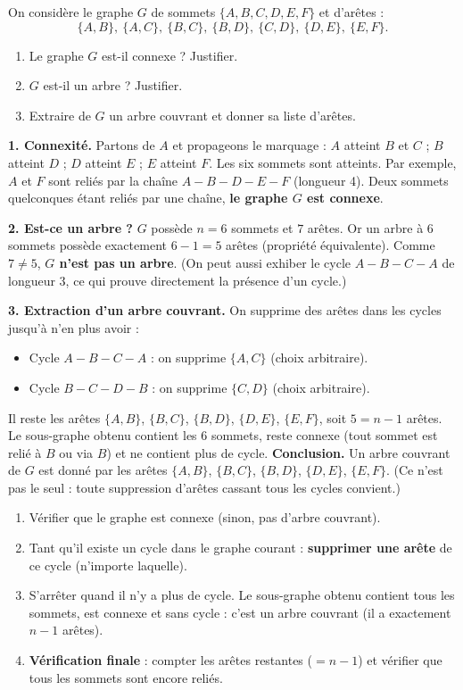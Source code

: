 \documentclass[11pt]{article}
\newcounter{popsec}
\newcounter{popsub}
\newcommand{\courssub}[1]{%
  \stepcounter{popsub}%
  \par\vspace{9pt}\noindent{\popxbold\fontsize{11.5}{13}\selectfont\color{popink}{\color{poporange}\thepopsec.\thepopsub}\hspace{6pt}#1}\par\nopagebreak\vspace{4pt}
}
\begin{document}
\begin{exoresolu}
On considère le graphe $G$ de sommets $\{A,B,C,D,E,F\}$ et d'arêtes :
\[\{A,B\},\ \{A,C\},\ \{B,C\},\ \{B,D\},\ \{C,D\},\ \{D,E\},\ \{E,F\}.\]
\begin{enumerate}
\item Le graphe $G$ est-il connexe ? Justifier.
\item $G$ est-il un arbre ? Justifier.
\item Extraire de $G$ un arbre couvrant et donner sa liste d'arêtes.
\end{enumerate}
\tcblower
\textbf{1. Connexité.} Partons de $A$ et propageons le marquage :
$A$ atteint $B$ et $C$ ; $B$ atteint $D$ ; $D$ atteint $E$ ; $E$ atteint $F$.
Les six sommets sont atteints. Par exemple, $A$ et $F$ sont reliés par la chaîne $A-B-D-E-F$ (longueur 4).
Deux sommets quelconques étant reliés par une chaîne, \textbf{le graphe $G$ est connexe}.

\textbf{2. Est-ce un arbre ?} $G$ possède $n = 6$ sommets et $7$ arêtes.
Or un arbre à $6$ sommets possède exactement $6-1 = 5$ arêtes (propriété équivalente).
Comme $7 \neq 5$, \textbf{$G$ n'est pas un arbre}.
(On peut aussi exhiber le cycle $A-B-C-A$ de longueur 3, ce qui prouve directement la présence d'un cycle.)

\textbf{3. Extraction d'un arbre couvrant.}
On supprime des arêtes dans les cycles jusqu'à n'en plus avoir :
\begin{itemize}
\item Cycle $A-B-C-A$ : on supprime $\{A,C\}$ (choix arbitraire).
\item Cycle $B-C-D-B$ : on supprime $\{C,D\}$ (choix arbitraire).
\end{itemize}
Il reste les arêtes $\{A,B\}$, $\{B,C\}$, $\{B,D\}$, $\{D,E\}$, $\{E,F\}$, soit $5 = n-1$ arêtes.
Le sous-graphe obtenu contient les 6 sommets, reste connexe (tout sommet est relié à $B$ ou via $B$) et ne contient plus de cycle.
\textbf{Conclusion.} Un arbre couvrant de $G$ est donné par les arêtes $\{A,B\}$, $\{B,C\}$, $\{B,D\}$, $\{D,E\}$, $\{E,F\}$. (Ce n'est pas le seul : toute suppression d'arêtes cassant tous les cycles convient.)
\end{exoresolu}

\courssub{Arbres et arbres couvrants}

\begin{methode}
\begin{enumerate}
\item Vérifier que le graphe est connexe (sinon, pas d'arbre couvrant).
\item Tant qu'il existe un cycle dans le graphe courant : \textbf{supprimer une arête} de ce cycle (n'importe laquelle).
\item S'arrêter quand il n'y a plus de cycle. Le sous-graphe obtenu contient tous les sommets, est connexe et sans cycle : c'est un arbre couvrant (il a exactement $n-1$ arêtes).
\item \textbf{Vérification finale} : compter les arêtes restantes ($= n-1$) et vérifier que tous les sommets sont encore reliés.
\end{enumerate}
\end{methode}
\end{document}
